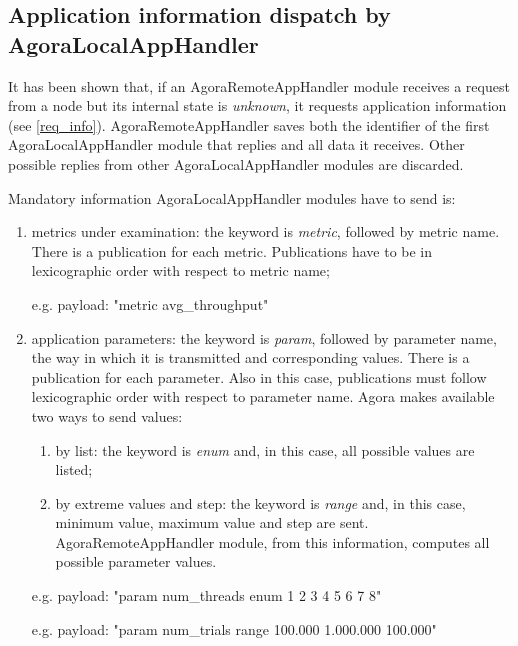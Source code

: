 \subsection{Application information dispatch by AgoraLocalAppHandler}\label{client_info}

It has been shown that, if an AgoraRemoteAppHandler module receives a request from a node but its internal state is \textit{unknown}, it requests application information (see \ref{req_info}). AgoraRemoteAppHandler saves both the identifier of the first AgoraLocalAppHandler module that replies and all data it receives. Other possible replies from other AgoraLocalAppHandler modules are discarded.

Mandatory information AgoraLocalAppHandler modules have to send is:

\begin{enumerate}

    \item metrics under examination: the keyword is \textit{metric}, followed by metric name. There is a publication for each metric. Publications have to be in lexicographic order with respect to metric name;
    
    e.g. payload: "metric avg\_throughput"
    
    \item application parameters: the keyword is \textit{param}, followed by parameter name, the way in which it is transmitted and corresponding values. There is a publication for each parameter. Also in this case, publications must follow lexicographic order with respect to parameter name. Agora makes available two ways to send values:
    
    \begin{enumerate}
    
        \item by list: the keyword is \textit{enum} and, in this case, all possible values are listed;
        
        \item by extreme values and step: the keyword is \textit{range} and, in this case, minimum value, maximum value and step are sent. AgoraRemoteAppHandler module, from this information, computes all possible parameter values.
    
    \end{enumerate}
    
    e.g. payload: "param num\_threads enum 1 2 3 4 5 6 7 8"
    
    e.g. payload: "param num\_trials range 100.000 1.000.000 100.000"

\end{enumerate}

